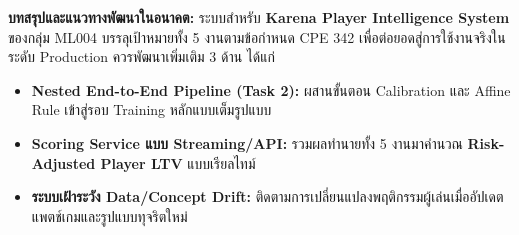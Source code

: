 \documentclass[11pt,a4paper]{article}
\begin{document}
\textbf{บทสรุปและแนวทางพัฒนาในอนาคต:} ระบบสำหรับ \textbf{Karena Player Intelligence System} ของกลุ่ม ML004 บรรลุเป้าหมายทั้ง 5 งานตามข้อกำหนด CPE 342 เพื่อต่อยอดสู่การใช้งานจริงในระดับ Production ควรพัฒนาเพิ่มเติม 3 ด้าน ได้แก่
\begin{itemize}[itemsep=1pt,topsep=2pt]
    \item \textbf{Nested End-to-End Pipeline (Task 2):} ผสานขั้นตอน Calibration และ Affine Rule เข้าสู่รอบ Training หลักแบบเต็มรูปแบบ
    \item \textbf{Scoring Service แบบ Streaming/API:} รวมผลทำนายทั้ง 5 งานมาคำนวณ \textbf{Risk-Adjusted Player LTV} แบบเรียลไทม์
    \item \textbf{ระบบเฝ้าระวัง Data/Concept Drift:} ติดตามการเปลี่ยนแปลงพฤติกรรมผู้เล่นเมื่ออัปเดตแพตช์เกมและรูปแบบทุจริตใหม่
\end{itemize}
\end{document}
